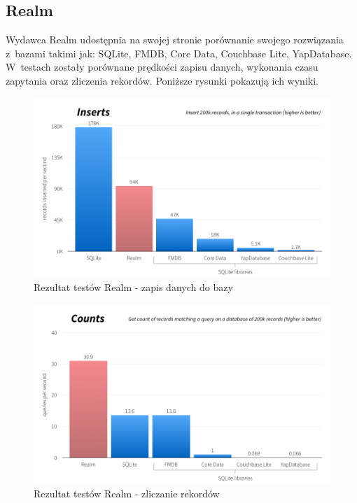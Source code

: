 \subsection{Realm}

Wydawca Realm udostępnia na swojej stronie porównanie swojego rozwiązania z~bazami takimi jak: SQLite, FMDB, Core Data, Couchbase Lite, YapDatabase. W~testach zostały porównane prędkości zapisu danych, wykonania czasu zapytania oraz zliczenia rekordów. Poniższe rysunki pokazują ich wyniki. \par

\begin{figure}[h]
\centering
	\includegraphics[width=\linewidth]{img/realm_insert_test.png}
	\caption{Rezultat testów Realm - zapis danych do bazy}
	\label{fig: realm_insert_test}
\end{figure}

\begin{figure}
\centering
	\includegraphics[width=\linewidth]{img/realm_count_test.png}
	\caption{Rezultat testów Realm - zliczanie rekordów}
	\label{fig: realm_count_test}
\end{figure}

